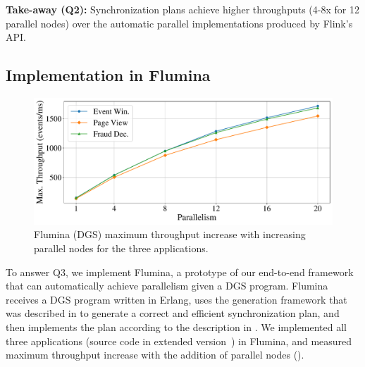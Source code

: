 \begin{takeaway}
\textbf{Take-away (Q2):}
Synchronization plans achieve higher throughputs (4-8x for 12 parallel nodes) over the automatic parallel implementations produced by Flink's API.
\end{takeaway}

\subsection{Implementation in Flumina}
\label{dgs:ssec:eval-prototype-performance}

\begin{figure}[t]
  \centering
  \includegraphics[width=0.8\columnwidth]{figures/dgs/flumina_max_throughput_scaleup.pdf}

  \caption[Flumina (DGS) throughput experiment.]{Flumina (DGS) maximum throughput increase with increasing parallel nodes for the three applications.
  }
  \label{dgs:fig:flumina-scaling}
\end{figure}

To answer Q3, we implement Flumina,
a prototype of our end-to-end framework that can automatically achieve parallelism given a DGS program.
Flumina receives a DGS program written in Erlang,
uses the generation framework that was described in  to generate a correct and efficient synchronization plan,
and then implements the plan according to the description in .
We implemented all three applications (source code in extended version~)
in Flumina, and measured maximum throughput increase with the addition of parallel nodes
().

